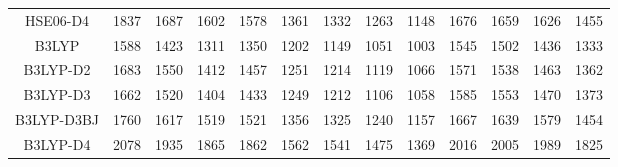 \begin{table}[ht]
\begin{tabular}{ccccccccccccc}
HSE06-D4 & 1837 & 1687 & 1602 & 1578 & 1361 & 1332 & 1263 & 1148 & 1676 & 1659 & 1626 & 1455 \\ 
B3LYP & 1588 & 1423 & 1311 & 1350 & 1202 & 1149 & 1051 & 1003 & 1545 & 1502 & 1436 & 1333 \\ 
B3LYP-D2 & 1683 & 1550 & 1412 & 1457 & 1251 & 1214 & 1119 & 1066 & 1571 & 1538 & 1463 & 1362 \\ 
B3LYP-D3 & 1662 & 1520 & 1404 & 1433 & 1249 & 1212 & 1106 & 1058 & 1585 & 1553 & 1470 & 1373 \\ 
B3LYP-D3BJ & 1760 & 1617 & 1519 & 1521 & 1356 & 1325 & 1240 & 1157 & 1667 & 1639 & 1579 & 1454 \\ 
B3LYP-D4 & 2078 & 1935 & 1865 & 1862 & 1562 & 1541 & 1475 & 1369 & 2016 & 2005 & 1989 & 1825 \\ 
\hline\hline
\end{tabular}
\end{table}